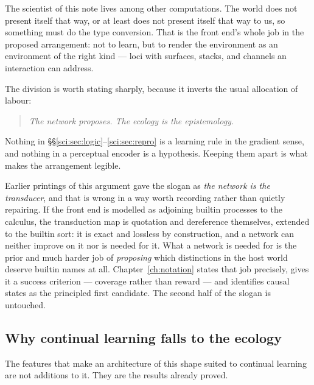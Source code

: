 The scientist of this note lives among other computations. The world does not present itself that way,
or at least does not present itself that way to us, so something must do the type conversion. That is
the front end's whole job in the proposed arrangement: not to learn, but to render the environment as
an environment of the right kind --- loci with surfaces, stacks, and channels an interaction can
address.

The division is worth stating sharply, because it inverts the usual allocation of labour:

\begin{quote}
\itshape The network proposes. The ecology is the epistemology.
\end{quote}

Nothing in \S\S\ref{sci:sec:logic}--\ref{sci:sec:repro} is a learning rule in the gradient sense, and nothing
in a perceptual encoder is a hypothesis. Keeping them apart is what makes the arrangement legible.

\begin{remark}
\label{sci:rem:transducer}
Earlier printings of this argument gave the slogan as \emph{the network is the transducer}, and that is
wrong in a way worth recording rather than quietly repairing. If the front end is modelled as adjoining
builtin processes to the calculus, the transduction map is quotation and dereference themselves, extended
to the builtin sort: it is exact and lossless by construction, and a network can neither improve on it nor
is needed for it. What a network is needed for is the prior and much harder job of \emph{proposing} which
distinctions in the host world deserve builtin names at all. Chapter~\ref{ch:notation} states that job
precisely, gives it a success criterion --- coverage rather than reward --- and identifies causal states as
the principled first candidate. The second half of the slogan is untouched.
\end{remark}

\subsection{Why continual learning falls to the ecology}\label{sci:S17.2}

The features that make an architecture of this shape suited to continual learning are not additions to
it. They are the results already proved.

